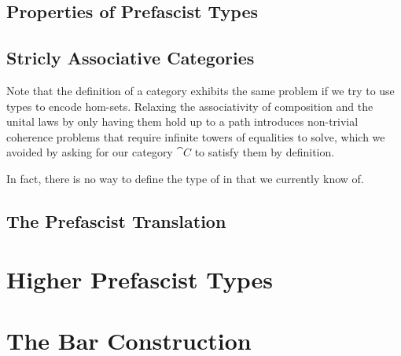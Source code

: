 \subsection{Properties of Prefascist Types}

\subsection{Stricly Associative Categories}\label{sec:cat-strictification}

Note that the definition of a category exhibits the same problem if we try to
use types to encode hom-sets. 
% 
Relaxing the associativity of composition and the unital laws by only having
them hold up to a path introduces non-trivial coherence problems that require 
infinite towers of equalities to solve, which we avoided by asking for our
category \( \cat{C} \) to satisfy them by definition.

In fact, there is no way to define the type of  in \HoTT that we currently know of. 

\subsection{The Prefascist Translation}

\section{Higher Prefascist Types}

\section{The Bar Construction}